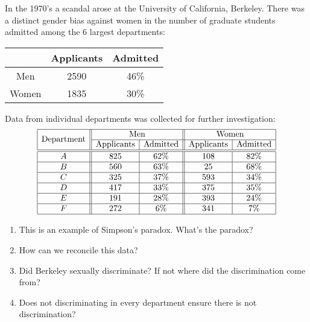 \documentclass[nooutcomes,noauthor,hints,handout]{ximera}
\begin{document}
\begin{question}
In the 1970's a scandal arose at the University of California,
Berkeley. There was a distinct gender bias against women in the number
of graduate students admitted among the 6 largest departments:
\begin{center}
\begin{tabular}{|c||c|c|} \hline
 & Applicants & Admitted \\ \hline\hline
Men & 2590 & 46\% \\ \hline
Women & 1835 & 30\% \\ \hline
\end{tabular}
\end{center}
Data from individual departments was collected for further investigation:
\[
\begin{array}{|c||c|c||c|c|} \hline
\multirow{2}{*}{\text{Department}} & \multicolumn{2}{c||}{\text{Men}} & \multicolumn{2}{c|}{\text{Women}}  \\\cline{2-5}
 & \text{Applicants} & \text{Admitted} & \text{Applicants} & \text{Admitted} \\\hline\hline
A & 825 & 62\% & 108 & 82\%\\ \hline
B & 560 & 63\% & 25 & 68\% \\ \hline
C & 325 & 37\% & 593 & 34\% \\ \hline
D & 417 & 33\% & 375 & 35\% \\ \hline
E & 191 & 28\% & 393 & 24\% \\ \hline
F & 272 & 6\% & 341 & 7\% \\ \hline
\end{array}
\]

\begin{enumerate}
\item This is an example of Simpson's paradox. What's the paradox?
\item How can we reconcile this data?
\item Did Berkeley sexually discriminate? If not where did the discrimination come from?
\item Does not discriminating in every department ensure there is not discrimination?
\end{enumerate}

\end{question}
\end{document}
